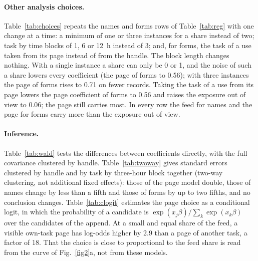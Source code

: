\documentclass[10pt]{article}
\begin{document}
\paragraph{Other analysis choices.} Table~\ref{tab:choices} repeats the names and forms rows of Table~\ref{tab:reg} with one change at a time: a minimum of one or three instances for a share instead of two; task by time blocks of 1, 6 or 12~h instead of 3; and, for forms, the task of a use taken from its page instead of from the handle. The block length changes nothing. With a single instance a share can only be 0 or 1, and the noise of such a share lowers every coefficient (the page of forms to 0.56); with three instances the page of forms rises to 0.71 on fewer records. Taking the task of a use from its page lowers the page coefficient of forms to 0.56 and raises the exposure out of view to 0.06; the page still carries most. In every row the feed for names and the page for forms carry more than the exposure out of view.

\paragraph{Inference.} Table~\ref{tab:wald} tests the differences between coefficients directly, with the full covariance clustered by handle. Table~\ref{tab:twoway} gives standard errors clustered by handle and by task by three-hour block together (two-way clustering, not additional fixed effects): those of the page model double, those of names change by less than a fifth and those of forms by up to two fifths, and no conclusion changes. Table~\ref{tab:clogit} estimates the page choice as a conditional logit, in which the probability of a candidate is $\exp(x_j\beta)/\sum_k\exp(x_k\beta)$ over the candidates of the append. At a small and equal share of the feed, a visible own-task page has log-odds higher by 2.9 than a page of another task, a factor of 18. That the choice is close to proportional to the feed share is read from the curve of Fig.~\ref{fig2}a, not from these models.

\begin{table}[htbp]\centering\small
\caption{\textbf{Where to write.} Linear probability model of whether a candidate page is the one chosen, within the append; 1,894 appends and 87,349 candidates; standard errors clustered by handle; within-append $R^2$ of 0.10.}\label{tab:reg_pages}

\end{table}

\begin{table}[htbp]\centering\small
\caption{\textbf{How to sign.} Linear probability model of whether a newcomer's name carries a feature, on the share of the feature among four groups of predecessors of the previous six hours and the indicator $m_i$ of a first page without two earlier task-mates; 16 features, 9,728 records; standard errors clustered by handle; $R^2$ of 0.34, 0.34, 0.37 and 0.40 for the first four columns, which add intercepts one set at a time. The last four columns vary the window of the task-mates, own-task predecessors only, with task by three-hour intercepts.}\label{tab:reg_names}
\resizebox{\textwidth}{!}{}
\end{table}
\end{document}
